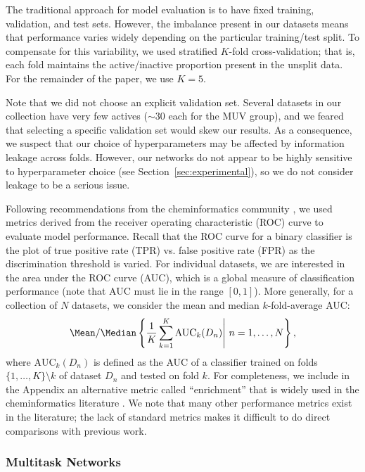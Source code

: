 The traditional approach for model evaluation is to have fixed training,
validation, and test sets.  However, the imbalance present in our datasets
means that performance varies widely depending on the particular
training/test split. To compensate for this variability, we used stratified
$K$-fold cross-validation; that is, each fold maintains the active/inactive
proportion present in the unsplit data. For the remainder of the paper, we
use $K=5$.

Note that we did not choose an explicit validation set. Several datasets in
our collection have very few actives ($\sim30$ each for the MUV group), and
we feared that selecting a specific validation set would skew our results.
As a consequence, we suspect that our choice of hyperparameters may be
affected by information leakage across folds. However, our networks do not
appear to be highly sensitive to hyperparameter choice (see
Section~\ref{sec:experimental}), so we do not consider leakage to be a
serious issue.

Following recommendations from the cheminformatics community
\cite{jain2008recommendations}, we used metrics derived from the receiver
operating characteristic (ROC) curve to evaluate model performance. Recall
that the ROC curve for a binary classifier is the plot of true positive
rate (TPR) vs. false positive rate (FPR) as the discrimination threshold is
varied.  For individual datasets, we are interested in the area under the
ROC curve (AUC), which is a global measure of classification performance
(note that AUC must lie in the range $[0, 1]$).  More generally, for a
collection of $N$ datasets, we consider the mean and median
$k$-fold-average AUC:
\[
\Mean/\Median\left \{\frac{1}{K} \sum_{k=1}^K \text{AUC}_k(D_n)\middle | \ n=1,\dotsc,N\right \},
\]
where $\text{AUC}_k(D_n)$ is defined as the AUC of a classifier trained on
folds $\{1,\dotsc,K\} \setminus k$ of dataset $D_n$ and tested on fold $k$.
For completeness, we include in the Appendix an alternative metric called
``enrichment'' that is widely used in the cheminformatics literature
\cite{jain2008recommendations}. We note that many other performance metrics
exist in the literature; the lack of standard metrics makes it difficult to
do direct comparisons with previous work.

\subsubsection{Multitask Networks}

